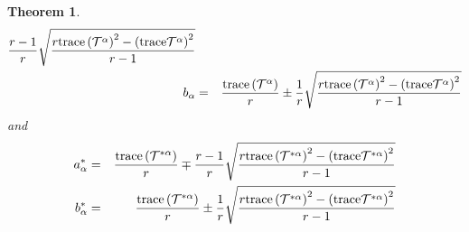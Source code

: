 \documentclass[10pt,a4paper]{article}
\newtheorem{theorem}{Theorem}[section]
\theoremstyle{definition}
\theoremstyle{remark}
\numberwithin{equation}{section}
\begin{document}
\begin{theorem}
\begin{eqnarray*}
\frac{r-1}{r}\sqrt{\frac{r{\rm trace}\left( {\cal T}^{\alpha }\right)
^{2}-\left( {\rm trace}{\cal T}^{\alpha }\right) ^{2}}{r-1}} \\
b_{\alpha } &=&\frac{{\rm trace}\left( {\cal T}^{\alpha }\right) }{r}\pm 
\frac{1}{r}\sqrt{\frac{r{\rm trace}\left( {\cal T}^{\alpha }\right)
^{2}-\left( {\rm trace}{\cal T}^{\alpha }\right) ^{2}}{r-1}}
\end{eqnarray*}%
and%
\begin{eqnarray*}
a_{\alpha }^{\ast } &=&\frac{{\rm trace}\left( {\cal T}^{\ast \alpha
}\right) }{r}\mp \frac{r-1}{r}\sqrt{\frac{r{\rm trace}\left( {\cal T}^{\ast
\alpha }\right) ^{2}-\left( {\rm trace}{\cal T}^{\ast \alpha }\right) ^{2}}{%
r-1}} \\
b_{\alpha }^{\ast } &=&\frac{{\rm trace}\left( {\cal T}^{\ast \alpha
}\right) }{r}\pm \frac{1}{r}\sqrt{\frac{r{\rm trace}\left( {\cal T}^{\ast
\alpha }\right) ^{2}-\left( {\rm trace}{\cal T}^{\ast \alpha }\right) ^{2}}{%
r-1}}
\end{eqnarray*}
\end{theorem}
\end{document}
